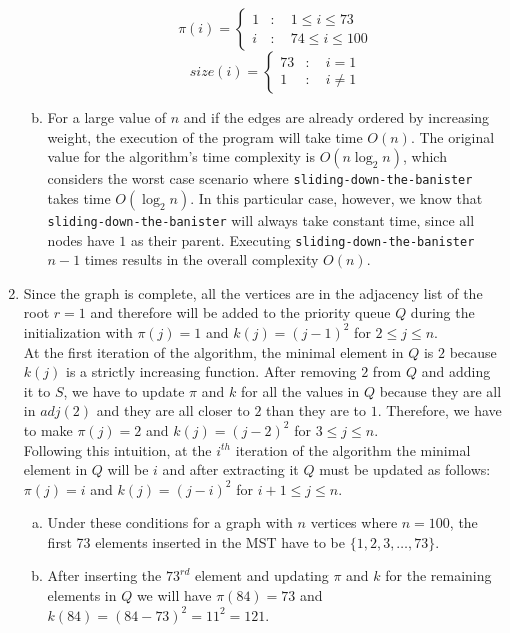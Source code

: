 \documentclass{article}
\begin{document}
\begin{enumerate}[1.]
\begin{enumerate}[(a)]
        \[
        \pi(i)= 
        \begin{cases}
            1       &:\quad 1 \leq i \leq 73\\
            i       &:\quad 74 \leq i \leq 100
        \end{cases}
        \]
        \[
        size(i)= 
        \begin{cases}
            73       &:\quad i = 1\\
            1       &:\quad i \neq 1
        \end{cases}
        \]
        
        \item For a large value of $n$ and if the edges are already ordered by increasing weight, the execution of the program will take time $O(n)$. The original value for the algorithm's time complexity is $O(n\log_2n)$, which considers the worst case scenario where \texttt{sliding-down-the-banister} takes time $O(\log_2n)$. In this particular case, however, we know that \texttt{sliding-down-the-banister} will always take constant time, since all nodes have $1$ as their parent. Executing \texttt{sliding-down-the-banister} $n-1$ times results in the overall complexity $O(n)$.
    \end{enumerate}
    
    \item Since the graph is complete, all the vertices are in the adjacency list of the root $r = 1$ and therefore will be added to the priority queue $Q$ during the initialization with $\pi(j) = 1$ and $k(j) = (j - 1)^2$ for $2 \leq j \leq n$.\\
    At the first iteration of the algorithm, the minimal element in $Q$ is $2$ because $k(j)$ is a strictly increasing function. After removing $2$ from $Q$ and adding it to $S$, we have to update $\pi$ and $k$ for all the values in $Q$ because they are all in $adj(2)$ and they are all closer to $2$ than they are to $1$. Therefore, we have to make $\pi(j) = 2$ and $k(j) = (j - 2)^2$ for $3 \leq j \leq n$.\\
    Following this intuition, at the $i^{th}$ iteration of the algorithm the minimal element in $Q$ will be $i$ and after extracting it $Q$ must be updated as follows: $\pi(j) = i$ and $k(j) = (j - i)^2$ for $i + 1 \leq j \leq n$.
    \begin{enumerate}[(a)]
        \item Under these conditions for a graph with $n$ vertices where $n = 100$, the first 73 elements inserted in the MST have to be $\{1, 2, 3, \ldots , 73\}$.
        \item After inserting the $73^{rd}$ element and updating $\pi$ and $k$ for the remaining elements in $Q$ we will have $\pi(84) = 73$ and $k(84) = (84 - 73)^2 = 11^2 = 121$.
    \end{enumerate}
\end{enumerate}
\end{document}
